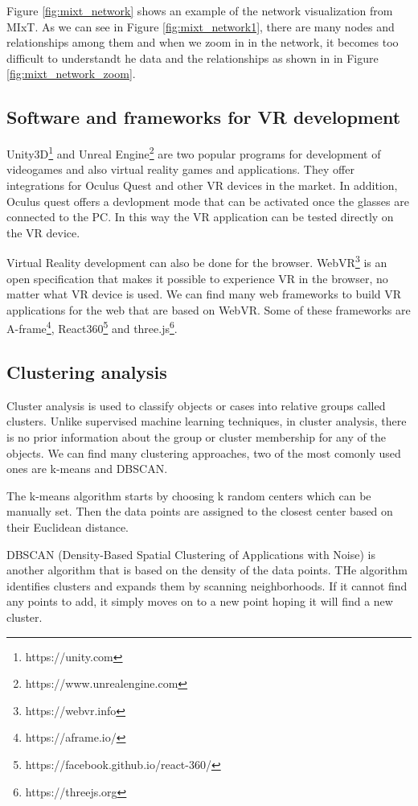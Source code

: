 Figure \ref{fig:mixt_network} shows an example of the network visualization from MIxT. As we can see in Figure \ref{fig:mixt_network1}, there are many nodes and relationships among them and when we zoom in in the network, it becomes too difficult to understandt he data and the relationships as shown in in Figure \ref{fig:mixt_network_zoom}.

\subsection{Software and frameworks for VR development}
Unity3D\footnote{https://unity.com} and Unreal Engine\footnote{https://www.unrealengine.com} are two popular programs for development of videogames and also virtual reality games and applications. They offer integrations for Oculus Quest and other VR devices in the market. In addition, Oculus quest offers a devlopment mode that can be activated once the glasses are connected to the PC. In this way the VR application can be tested directly on the VR device.

Virtual Reality development can also be done for the browser. WebVR\footnote{https://webvr.info} is an open specification that makes it possible to experience VR in the browser, no matter what VR device is used. We can find many web frameworks to build VR applications for the web that are based on WebVR. Some of these frameworks are A-frame\footnote{https://aframe.io/}, React360\footnote{https://facebook.github.io/react-360/} and three.js\footnote{https://threejs.org}.

\subsection{Clustering analysis}
Cluster analysis is used to classify objects or cases into relative groups called clusters. Unlike supervised machine learning techniques, in cluster analysis, there is no prior information about the group or cluster membership for any of the objects. We can find many clustering approaches, two of the most comonly used ones are k-means and DBSCAN.

The k-means algorithm starts by choosing k random centers which can be manually set. Then the data points are assigned to the closest center based on their Euclidean distance.

DBSCAN (Density-Based Spatial Clustering of Applications with Noise) is another algorithm that is based on the density of the data points. THe algorithm identifies clusters and expands them by scanning neighborhoods. If it cannot find any points to add, it simply moves on to a new point hoping it will find a new cluster.

